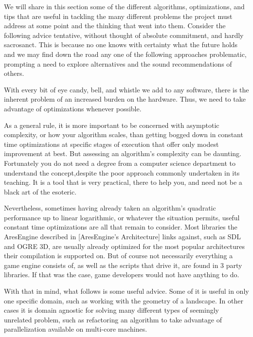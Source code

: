 
We will share in this section some of the different algorithms, optimizations, and tips that are useful in tackling the many different problems the project must address at some point and the thinking that went into them. Consider the following advice tentative, without thought of absolute commitment, and hardly sacrosanct. This is because no one knows with certainty what the future holds and we may find down the road any one of the following approaches problematic, prompting a need to explore alternatives and the sound recommendations of others. 

With every bit of eye candy, bell, and whistle we add to any software, there is the inherent problem of an increased burden on the hardware. Thus, we need to take advantage of optimizations whenever possible. 

As a general rule, it is more important to be concerned with asymptotic complexity, or how your algorithm scales, than getting bogged down in constant time optimizations at specific stages of execution that offer only modest improvement at best. But assessing an algorithm's complexity can be daunting. Fortunately you do not need a degree from a computer science department to understand the concept, despite the poor approach commonly undertaken in its teaching. It is a tool that is very practical, there to help you, and need not be a black art of the esoteric.

Nevertheless, sometimes having already taken an algorithm's quadratic performance up to linear logarithmic, or whatever the situation permits, useful constant time optimizations are all that remain to consider. Most libraries the AresEngine described in [AresEngine's Architecture] links against, such as SDL and OGRE 3D, are usually already optimized for the most popular architectures their compilation is supported on. But of course not necessarily everything a game engine consists of, as well as the scripts that drive it, are found in 3 party libraries. If that was the case, game developers would not have anything to do.

With that in mind, what follows is some useful advice. Some of it is useful in only one specific domain, such as working with the geometry of a landscape. In other cases it is domain agnostic for solving many different types of seemingly unrelated problem, such as refactoring an algorithm to take advantage of parallelization available on multi-core machines.

